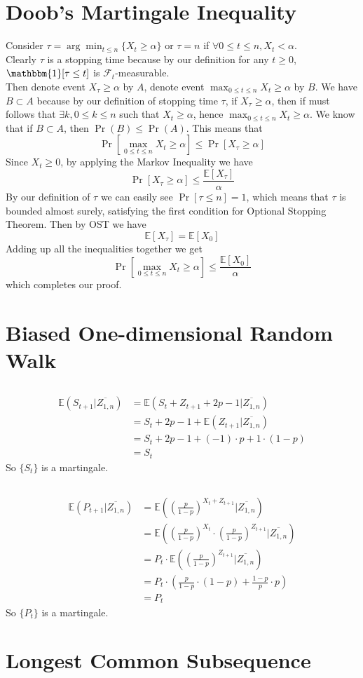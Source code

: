 \documentclass[12pt,letterpaper]{article}
\begin{document}
\section{Doob's Martingale Inequality}
Consider $\tau=\arg\min_{t\leq n}\{X_t\geq\alpha\}$ or $\tau=n$ if $\forall 0\leq t\leq n, X_t<\alpha$.\\
Clearly $\tau$ is a stopping time because by our definition 
for any $t\geq 0$, $\mathbbm{1}[\tau\leq t]$ is $\mathcal{F}_t$-measurable.\\
Then denote event $X_{\tau}\geq\alpha$ by $A$,
denote event $\max_{0\leq t\leq n}X_t\geq\alpha$ by $B$.
We have $B\subset A$ because by our definition of stopping time $\tau$,
if $X_{\tau}\geq\alpha$,
then if must follows that $\exists k, 0\leq k\leq n$ such that $X_t\geq\alpha$,
hence $\max_{0\leq t\leq n}X_t\geq\alpha$.
We know that if $B\subset A$, then $\Pr(B)\leq\Pr(A)$.
This means that
$$\Pr \left[\max_{0\leq t\leq n}X_t\geq\alpha\right]\leq \Pr\left[X_{\tau}\geq\alpha\right]$$
Since $X_t\geq 0$, by applying the Markov Inequality we have
$$\Pr\left[X_{\tau}\geq\alpha\right]\leq \frac{\mathbb{E}\left[X_{\tau}\right]}{\alpha}$$
By our definition of $\tau$ we can easily see $\Pr[\tau\leq n]=1$,
which means that $\tau$ is bounded almost surely,
satisfying the first condition for Optional Stopping Theorem.
Then by OST we have
$$\mathbb{E}[X_{\tau}]=\mathbb{E}[{X_0}]$$
Adding up all the inequalities together we get 
$$\Pr \left[\max_{0\leq t\leq n}X_t\geq\alpha\right]\leq \frac{\mathbb{E}\left[X_{0}\right]}{\alpha}$$
which completes our proof.

\section{Biased One-dimensional Random Walk}
\subsection{}
\begin{align}
  \mathbb{E}(S_{t+1}|\overline{Z_{1,n}})
  &=\mathbb{E}(S_t+Z_{t+1}+2p-1|\overline{Z_{1,n}})\\
  &=S_t+2p-1+\mathbb{E}(Z_{t+1}|\overline{Z_{1,n}})\\
  &=S_t+2p-1+(-1)\cdot p+1\cdot(1-p)\\
  &=S_t
\end{align}
So $\{S_t\}$ is a martingale.
\subsection{}
\begin{align}
  \mathbb{E}(P_{t+1}|\overline{Z_{1,n}})
  &=\mathbb{E}((\frac{p}{1-p})^{X_t+Z_{t+1}}|\overline{Z_{1,n}})\\
  &=\mathbb{E}((\frac{p}{1-p})^{X_t}\cdot(\frac{p}{1-p})^{Z_{t+1}}|\overline{Z_{1,n}})\\
  &=P_t\cdot\mathbb{E}((\frac{p}{1-p})^{Z_{t+1}}|\overline{Z_{1,n}})\\
  &=P_t\cdot(\frac{p}{1-p}\cdot(1-p)+\frac{1-p}{p}\cdot p)\\
  &=P_t
\end{align}
So $\{P_t\}$ is a martingale.
\subsection{}

\section{Longest Common Subsequence}
\end{document}
